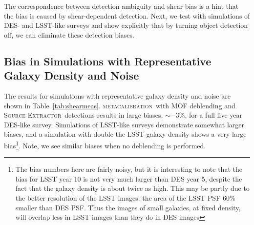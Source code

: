 \documentclass[iop, appendixfloats, numberedappendix, apj]{emulateapj}
\newcommand{\mcal}{\textsc{metacalibration}}
\newcommand{\sx}{\textsc{Source Extractor}}
\begin{document}
The correspondence between detection ambiguity and shear bias is a hint that
the bias is caused by shear-dependent detection. Next, we test with simulations
of DES- and LSST-like surveys and show explicitly that by turning object
detection off, we can eliminate these detection biases.


\subsection{Bias in Simulations with Representative Galaxy Density and Noise}

The results for simulations with representative galaxy density and noise are
shown in Table~\ref{tab:shearmeas}.  \mcal\ with MOF deblending and \sx\
detections results in large biases, $\sim-3\%$, for a full five year
DES-like survey. Simulations of LSST-like surveys demonstrate somewhat larger
biases, and a simulation with double the LSST galaxy density shows a very large
bias\footnote{The bias numbers here are fairly noisy, but it is interesting to
note that the bias for LSST year 10 is not very much larger than DES year 5,
despite the fact that the galaxy density is about twice as high.  This may be
partly due to the better resolution of the LSST images: the area of the LSST
PSF 60\% smaller than DES PSF.  Thus the images of
small galaxies, at fixed density, will overlap less in LSST images than they do
in DES images}.  Note, we see similar biases when no deblending is performed.
\end{document}
